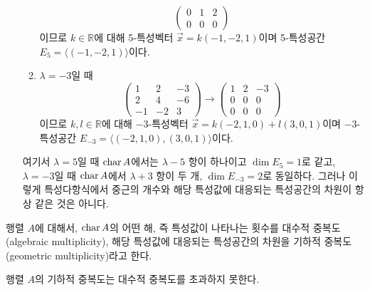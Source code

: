 \documentclass[sections/engineering_mathematics_lecture_note.tex]{subfiles}
\begin{document}
\begin{example}
\begin{enumerate}
\begin{enumerate}
\begin{equation*}
\begin{pmatrix}
                            0 & 1 & 2\\
                            0 & 0 & 0
                        \end{pmatrix}
                    \end{equation*}
                    이므로 $k \in \mathbb R$에 대해 5-특성벡터 $\vec x = k(-1, -2, 1)$이며 5-특성공간 $E_5 = \langle (-1, -2, 1) \rangle$이다.
                \item $\lambda = -3$일 때
                    \begin{equation*}
                        \begin{pmatrix}
                            1 & 2 & -3\\
                            2 & 4 & -6\\
                            -1 & -2 & 3
                        \end{pmatrix}
                        \rightarrow
                        \begin{pmatrix}
                            1 & 2 & -3\\
                            0 & 0 & 0\\
                            0 & 0 & 0
                        \end{pmatrix}
                    \end{equation*}
                    이므로 $k, l \in \mathbb R$에 대해 $-3$-특성벡터 $\vec x = k(-2, 1, 0) + l(3, 0, 1)$이며 $-3$-특성공간 $E_{-3} = \langle (-2, 1, 0), (3, 0, 1)\rangle$이다.
            \end{enumerate}
            여기서 $\lambda = 5$일 때 $\operatorname{char} A$에서는 $\lambda - 5$ 항이 하나이고 $\dim E_5 = 1$로 같고, $\lambda = -3$일 때 $\operatorname{char} A$에서 $\lambda + 3$ 항이 두 개, $\dim E_{-3} = 2$로 동일하다.
            그러나 이렇게 특성다항식에서 중근의 개수와 해당 특성값에 대응되는 특성공간의 차원이 항상 같은 것은 아니다.
    \end{enumerate}
\end{example}

\begin{definition}
    행렬 $A$에 대해서, $\operatorname{char} A$의 어떤 해, 즉 특성값이 나타나는 횟수를 대수적 중복도(algebraic multiplicity), 해당 특성값에 대응되는 특성공간의 차원을 기하적 중복도(geometric multiplicity)라고 한다.
\end{definition}

\begin{theorem}
    행렬 $A$의 기하적 중복도는 대수적 중복도를 초과하지 못한다.
\end{theorem}
\end{document}
